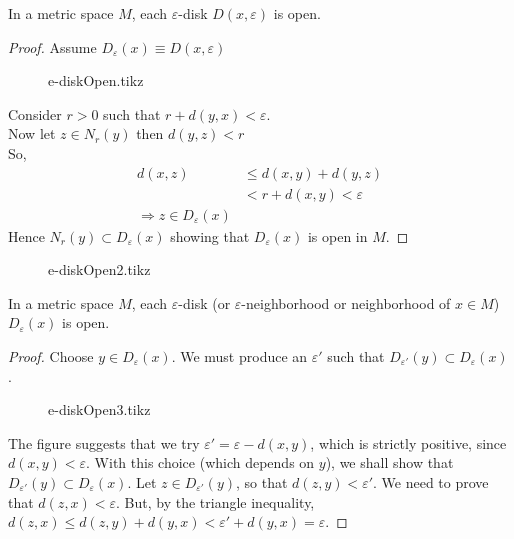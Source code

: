 \documentclass[../main-sheet.tex]{subfiles}
\begin{document}
\newpage
\begin{thm}
    In a metric space $ M $, each $ \varepsilon $-disk $ D(x,\varepsilon) $ is open.
\end{thm}
\begin{proof}
    Assume $ D_\varepsilon(x)\equiv D(x,\varepsilon) $
    \begin{figure}[H]%
        \centering
        \vspace{-30pt}
        {e-diskOpen.tikz}
        \vspace{-30pt}
    \end{figure}
    Consider $ r> 0 $ such that $ r+d(y,x)<\varepsilon $.\\
    Now let $ z\in N_r(y) $ then $ d(y,z)<r $\\
    So,
    \begin{align*}
        d(x,z)& \leq d(x,y)+d(y,z)\\
        & < r+ d(x,y)<\varepsilon\\
        \Rightarrow z\in D_\varepsilon(x)& 
    \end{align*}
    Hence $ N_r(y)\subset D_\varepsilon(x) $ showing that $ D_\varepsilon(x) $ is open in $ M $.
\end{proof}
\begin{figure}[H]
        \centering
        {e-diskOpen2.tikz}
\end{figure}
\newpage
\begin{thm}
    In a metric space $ M $, each $ \varepsilon $-disk (or $ \varepsilon $-neighborhood or neighborhood of $ x\in M $) $ D_\varepsilon(x) $ is open.
\end{thm}
\begin{proof}
    Choose $ y\in D_\varepsilon(x) $. We must produce an $ \varepsilon' $ such that $ D_{\varepsilon'}(y)\subset D_\varepsilon(x) $.
    \begin{figure}[H]
        \centering
        {e-diskOpen3.tikz}
    \end{figure}
    The figure suggests that we try $ \varepsilon'=\varepsilon-d(x,y) $, which is strictly positive, since $ d(x,y)<\varepsilon $. With this choice (which depends on $ y $), we shall show that $ D_{\varepsilon'}(y)\subset D_\varepsilon(x) $. Let $ z\in D_{\varepsilon'}(y) $, so that $ d(z,y)<\varepsilon' $. We need to prove that $ d(z,x)<\varepsilon $. But, by the triangle inequality, $ d(z,x)\leq d(z,y)+d(y,x)<\varepsilon'+d(y,x)=\varepsilon $.
\end{proof}
\end{document}
